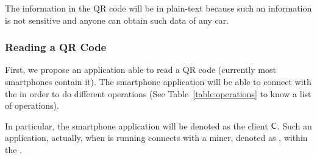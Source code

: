 The information in the QR code will be in plain-text because such an information is not sensitive and anyone 
can obtain such data of any car.


\subsubsection{Reading a QR Code}
\label{sssec:readingQR}

First, we propose an application able to read a QR code (currently most smartphones contain it).
The smartphone application will be able to connect with the \blockchaincarnetwork in order to do different 
operations (See Table~\ref{table:operations} to know a list of operations). 

In particular, the smartphone application will be denoted as the client $\textsf{C}$. Such an application, 
actually, when is running connects with a miner, denoted as \Server, within the \blockchaincarnetwork.




